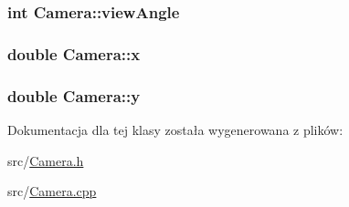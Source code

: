 \hypertarget{class_camera_a837aff0494c895ffbb77bc9feb8f19b4}{
\subsubsection[{view\-Angle}]{\setlength{\rightskip}{0pt plus 5cm}int Camera\-::view\-Angle\hspace{0.3cm}{\ttfamily [private]}}}\label{class_camera_a837aff0494c895ffbb77bc9feb8f19b4}
\hypertarget{class_camera_aebcfa32751541de5c3523a18bb70c0eb}{
\subsubsection[{x}]{\setlength{\rightskip}{0pt plus 5cm}double Camera\-::x\hspace{0.3cm}{\ttfamily [private]}}}\label{class_camera_aebcfa32751541de5c3523a18bb70c0eb}
\hypertarget{class_camera_ab1cd623bebcb4d23871b8b49231f808a}{
\subsubsection[{y}]{\setlength{\rightskip}{0pt plus 5cm}double Camera\-::y\hspace{0.3cm}{\ttfamily [private]}}}\label{class_camera_ab1cd623bebcb4d23871b8b49231f808a}


Dokumentacja dla tej klasy została wygenerowana z plików\-:\begin{DoxyCompactItemize}
\item 
src/\hyperlink{_camera_8h}{Camera.\-h}\item 
src/\hyperlink{_camera_8cpp}{Camera.\-cpp}\end{DoxyCompactItemize}
